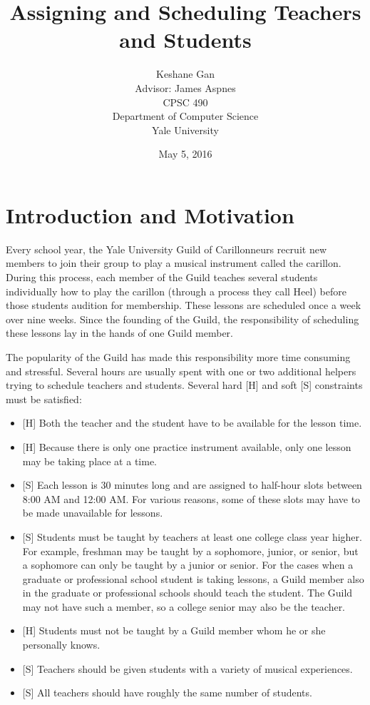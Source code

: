 \documentclass[letterpaper]{article}
\author{Keshane Gan\\
        Advisor: James Aspnes\\
        CPSC 490\\
        Department of Computer Science\\
        Yale University}
\date{May 5, 2016}
\title{Assigning and Scheduling Teachers and Students}
\begin{document}
\maketitle
\section{Introduction and Motivation}
Every school year, the Yale University Guild of Carillonneurs recruit new members to join their group to play a musical
instrument called the carillon. During this process, each member of the Guild teaches several students individually how to play the
carillon (through a process they call Heel) before those students audition for membership. These lessons are scheduled
once a week over nine weeks. Since the founding of the Guild, the responsibility of scheduling these lessons lay in the
hands of one Guild member. 

The popularity of the Guild has made this responsibility more time consuming and stressful. Several hours are usually
spent with one or two additional helpers trying to schedule teachers and students. Several hard [H] and soft [S] constraints
must be satisfied:
\begin{itemize}
    \item {[H]} Both the teacher and the student have to be available for the lesson time.
    \item {[H]} Because there is only one practice instrument available, only one lesson may be taking place at a time.
    \item {[S]} Each lesson is 30 minutes long and are assigned to half-hour slots between 8:00 AM and 12:00 AM. For various
        reasons, some of these slots may have to be made unavailable for lessons.
    \item {[S]} Students must be taught by teachers at least one college class year higher. For example, freshman may be
        taught by a sophomore, junior, or senior, but a sophomore can only be taught by a junior or senior. For the
        cases when a graduate or professional school student is taking lessons, a Guild member also in the graduate or
        professional schools should teach the student. The Guild may not have such a member, so a college senior may
        also be the teacher.
    \item {[H]} Students must not be taught by a Guild member whom he or she personally knows.
    \item {[S]} Teachers should be given students with a variety of musical experiences.
    \item {[S]} All teachers should have roughly the same number of students.
\end{itemize}
\end{document}
